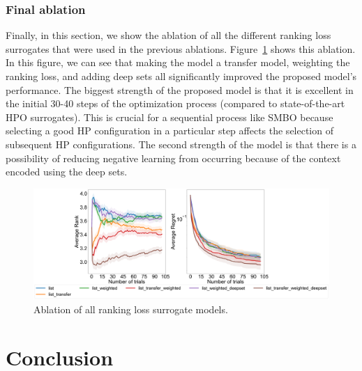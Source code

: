 \documentclass[12pt, twoside, ngerman]{report}
\begin{document}
\subsection{Final ablation}
Finally, in this section, we show the ablation of all the different ranking loss surrogates that were used in the previous ablations. Figure~\ref{fig:FinalAblation} shows this ablation. In this figure, we can see that making the model a transfer model, weighting the ranking loss, and adding deep sets all significantly improved the proposed model's performance. 
The biggest strength of the proposed model is that it is excellent in the initial 30-40 steps of the optimization process (compared to state-of-the-art HPO surrogates). This is crucial for a sequential process like SMBO because selecting a good HP configuration in a particular step affects the selection of subsequent HP configurations.
The second strength of the model is that there is a possibility of reducing negative learning from occurring because of the context encoded using the deep sets.

\begin{figure}[h]
  \centering
    \includegraphics[scale=0.20]{images/FinalAblation}
    \caption{Ablation of all ranking loss surrogate models.}
    \label{fig:FinalAblation}
\end{figure}

\chapter{Conclusion}
\end{document}
